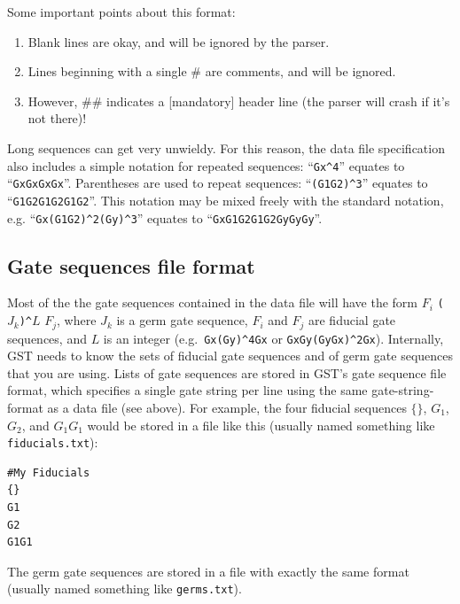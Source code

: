 \documentclass{article}[11pt]
\begin{document}
Some important points about this format:
\begin{enumerate}
\item Blank lines are okay, and will be ignored by the parser.
\item Lines beginning with a single \# are comments, and will be ignored.
\item However, \#\# indicates a [mandatory] header line (the parser will crash if it's not there)!  %
\end{enumerate}

Long sequences can get very unwieldy.  For this reason, the data file specification also includes a simple notation for repeated sequences:  ``\texttt{Gx\string^{}4}'' equates to ``\texttt{GxGxGxGx}''.  Parentheses are used to repeat sequences:  ``\texttt{(G1G2)\^{}3}'' equates to ``\texttt{G1G2G1G2G1G2}''.  This notation may be mixed freely with the standard notation, e.g. ``\texttt{Gx(G1G2)\^{}2(Gy)\^{}3}'' equates to ``\texttt{GxG1G2G1G2GyGyGy}''.

\subsection{Gate sequences file format}
Most of the the gate sequences contained in the data file will have the form $F_i$ \texttt{(}$J_k$\texttt{)\^{}}$L$ $F_j$, where $J_k$ is a germ gate sequence, $F_i$ and $F_j$ are fiducial gate sequences, and $L$ is an integer (e.g.~\texttt{Gx(Gy)\^{}4Gx} or \texttt{GxGy(GyGx)\^{}2Gx}).  Internally, GST needs to know the sets of fiducial gate sequences and of germ gate sequences that you are using.  Lists of gate sequences are stored in GST's gate sequence file format, which specifies a single gate string per line using the same gate-string-format as a data file (see above).  For example, the four fiducial sequences $\{\}$, $G_1$, $G_2$, and $G_1G_1$ would be stored in a file like this (usually named something like \texttt{fiducials.txt}):

\begin{minipage}{\linewidth}
\begin{lstlisting}[frame=single,caption=Example fiducial list]
#My Fiducials
{}
G1
G2
G1G1
\end{lstlisting}
\end{minipage}

\noindent The germ gate sequences are stored in a file with exactly the same format (usually named something like \texttt{germs.txt}).
\end{document}
